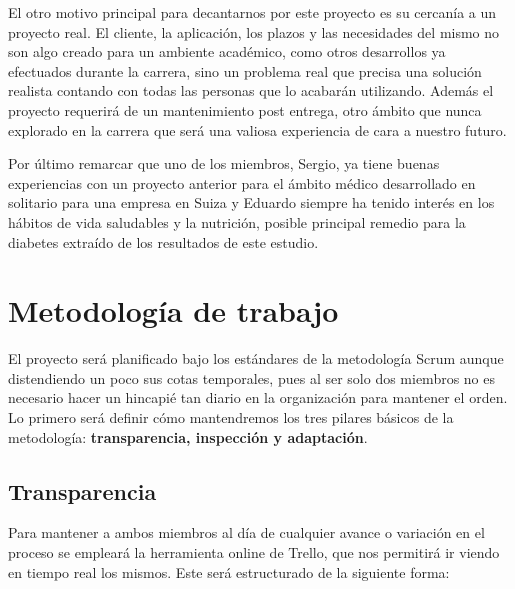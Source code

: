 	El otro motivo principal para decantarnos por este proyecto es su cercanía a un proyecto real. El cliente, la aplicación, los plazos y las necesidades del mismo no son algo creado para un ambiente académico, como otros desarrollos ya efectuados durante la carrera, sino un problema real que precisa una solución realista contando con todas las personas que lo acabarán utilizando. Además el proyecto requerirá de un mantenimiento post entrega, otro ámbito que nunca explorado en la carrera que será una valiosa experiencia de cara a nuestro futuro.\newline

	Por último remarcar que uno de los miembros, Sergio, ya tiene buenas experiencias con un proyecto anterior para el ámbito médico desarrollado en solitario para una empresa en Suiza y Eduardo siempre ha tenido interés en los hábitos de vida saludables y la nutrición, posible principal remedio para la diabetes extraído de los resultados de este estudio.\newpage
	
	\section{Metodología de trabajo}
    
    El proyecto será planificado bajo los estándares de la metodología Scrum aunque distendiendo un poco sus cotas temporales, pues al ser solo dos miembros no es necesario hacer un hincapié tan diario en la organización para mantener el orden. Lo primero será definir cómo mantendremos los tres pilares básicos de la metodología: \textbf{transparencia, inspección y adaptación}.
    
    \subsection{Transparencia}
    Para mantener a ambos miembros al día de cualquier avance o variación en el proceso se empleará la herramienta online de Trello, que nos permitirá ir viendo en tiempo real los mismos. Este será estructurado de la siguiente forma:
    

